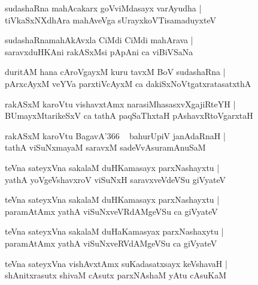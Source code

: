 \documentclass[twoside,12pt,openright]{book}
\newcounter{shloka}[chapter]
\begin{document}
\begin{shloka}%
sudashaRna mahAcakarx goVviMdasayx varAyudha |\\
tiVkaSxNXdhAra mahAveVga sUrayxkoVTisamaduyxteV
\end{shloka}

\begin{shloka}%
sudashaRnamahAkAvxla CiMdi CiMdi mahArava |\\
saravxduHKAni rakASxMsi pApAni ca viBiVSaNa 
\end{shloka}

\begin{shloka}%
duritAM hana cAroVgayxM kuru tavxM BoV sudashaRna |\\
pArxcAyxM veYVa parxtiVcAyxM ca dakiSxNoVtgatxratasatxthA 
\end{shloka}

\begin{shloka}%
rakASxM karoVtu vishavxtAmx narasiMhasasxvXgajiRteYH |\\
BUmayxMtarikeSxV ca tathA paqSaThxtaH pAshavxRtoVgarxtaH 
\end{shloka}

\begin{shloka}%
rakASxM karoVtu BagavA\char'366 ~ bahurUpiV janAdaRnaH |\\
tathA viSuNxmayaM saravxM sadeVvAsuramAnuSaM 
\end{shloka}

\begin{shloka}%
teVna sateyxVna sakalaM duHKamasayx parxNashayxtu |\\
yathA yoVgeVshavxroV viSuNxH saravxveVdeVSu giVyateV 
\end{shloka}

\begin{shloka}%
teVna sateyxVna sakalaM duHKamasayx parxNashayxtu |\\
paramAtAmx yathA viSuNxveVRdAMgeVSu ca giVyateV 
\end{shloka}

\begin{shloka}%
teVna sateyxVna sakalaM duHaKamasyax parxNashaxytu |\\
paramAtAmx yathA viSuNxveRVdAMgeVSu ca giVyateV
\end{shloka}

\begin{shloka}%
teVna sateyxVna vishAvxtAmx suKadasatxsayx keVshavaH |\\
shAnitxrasutx shivaM cAsutx parxNAshaM yAtu cAsuKaM 
\end{shloka}
\end{document}
